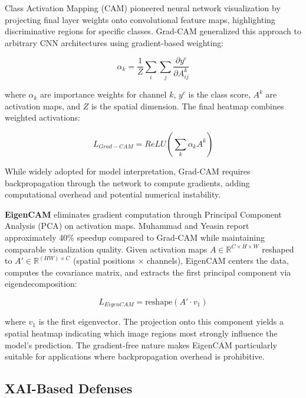 \documentclass[conference]{IEEEtran}
\begin{document}
Class Activation Mapping (CAM) \cite{zhou2016learning} pioneered neural network visualization by projecting final layer weights onto convolutional feature maps, highlighting discriminative regions for specific classes. Grad-CAM \cite{selvaraju2017grad} generalized this approach to arbitrary CNN architectures using gradient-based weighting:

\begin{equation}
\alpha_k = \frac{1}{Z} \sum_i \sum_j \frac{\partial y^c}{\partial A^k_{ij}}
\end{equation}

where $\alpha_k$ are importance weights for channel $k$, $y^c$ is the class score, $A^k$ are activation maps, and $Z$ is the spatial dimension. The final heatmap combines weighted activations:

\begin{equation}
L_{Grad-CAM} = ReLU\left(\sum_k \alpha_k A^k\right)
\end{equation}

While widely adopted for model interpretation, Grad-CAM requires backpropagation through the network to compute gradients, adding computational overhead and potential numerical instability.

\textbf{EigenCAM} \cite{muhammad2021eigen} eliminates gradient computation through Principal Component Analysis (PCA) on activation maps. Muhammad and Yeasin report approximately 40\% speedup compared to Grad-CAM while maintaining comparable visualization quality. Given activation maps $A \in \mathbb{R}^{C \times H \times W}$ reshaped to $A' \in \mathbb{R}^{(HW) \times C}$ (spatial positions $\times$ channels), EigenCAM centers the data, computes the covariance matrix, and extracts the first principal component via eigendecomposition:

\begin{equation}
L_{EigenCAM} = \text{reshape}(A' \cdot v_1)
\end{equation}

where $v_1$ is the first eigenvector. The projection onto this component yields a spatial heatmap indicating which image regions most strongly influence the model's prediction. The gradient-free nature makes EigenCAM particularly suitable for applications where backpropagation overhead is prohibitive.

\subsection{XAI-Based Defenses}
\end{document}
